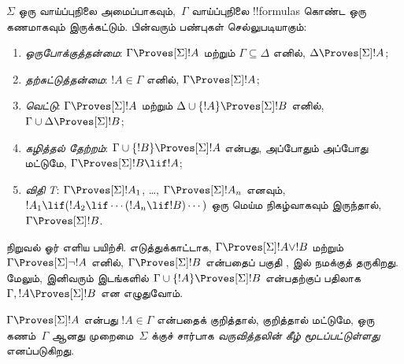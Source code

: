 \documentclass[../../../include/open-logic-section]{subfiles}
\begin{document}


\begin{prop}
  $\Sigma$ ஒரு வாய்ப்புநிலை அமைப்பாகவும்,~$\Gamma$ வாய்ப்புநிலை
  !!{formula}s கொண்ட ஒரு கணமாகவும் இருக்கட்டும். பின்வரும் பண்புகள்
  செல்லுபடியாகும்:
  \begin{enumerate}
  \item{} \emph{ஒருபோக்குத்தன்மை}:
    $\Gamma \Proves[\Sigma] !A$ மற்றும் $\Gamma \subseteq \Delta$ எனில்,
    $\Delta \Proves[\Sigma] !A$;
  \item{}
    \emph{தற்சுட்டுத்தன்மை}: $!A \in \Gamma$ எனில், $\Gamma
    \Proves[\Sigma] !A$;
  \item{} \emph{வெட்டு}: $\Gamma
    \Proves[\Sigma] !A$ மற்றும் $\Delta \cup \{!A\} \Proves[\Sigma] !B$
    எனில், $\Gamma \cup \Delta \Proves[\Sigma] !B$;
  \item{} \emph{கழித்தல் தேற்றம்}:
    $\Gamma \cup \{!B\} \Proves[\Sigma] !A$ என்பது, அப்போதும் அப்போது
    மட்டுமே, $\Gamma \Proves[\Sigma] !B \lif !A$;
  \item {} \emph{விதி T}:
    $\Gamma \Proves[\Sigma] !A_1$, \dots, $\Gamma
    \Proves[\Sigma] !A_n$ எனவும்,
    $!A_1 \lif (!A_2 \lif \cdots (!A_n \lif !B)\cdots)$ ஒரு மெய்ம
    நிகழ்வாகவும் இருந்தால், $\Gamma \Proves[\Sigma] !B$.
  \end{enumerate}
\end{prop}

நிறுவல் ஓர் எளிய பயிற்சி. எடுத்துக்காட்டாக, $\Gamma \Proves[\Sigma]
!A \lor !B$ மற்றும் $\Gamma \Proves[\Sigma] \lnot !A$ எனில்,
$\Gamma \Proves[\Sigma] !B$ என்பதைப் பகுதி
,  இல்
நமக்குத் தருகிறது. மேலும்,
இனிவரும் இடங்களில் $\Gamma \cup \{ !A\} \Proves[\Sigma] !B$ என்பதற்குப்
பதிலாக $\Gamma, !A \Proves[\Sigma] !B$ என எழுதுவோம்.

\begin{defn}
  $\Gamma \Proves[\Sigma] !A$ என்பது $!A \in \Gamma$ என்பதைக்
  குறித்தால், குறித்தால் மட்டுமே, ஒரு கணம்~$\Gamma$ ஆனது முறைமை~$\Sigma$
  க்குச் சார்பாக \emph{வருவித்தலின் கீழ் மூடப்பட்டுள்ளது} எனப்படுகிறது.
\end{defn}
\end{document}
